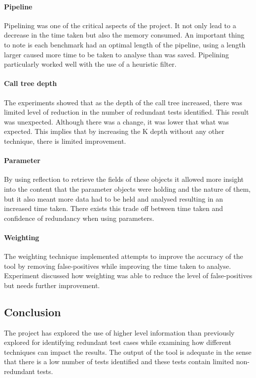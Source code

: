 \documentclass[11pt
              , a4paper
              , twoside
              , openright
              ]{report}
\newcommand{\rom}[1]{\uppercase\expandafter{\romannumeral #1\relax}}
\begin{document}
\paragraph{Pipeline}
Pipelining was one of the critical aspects of the project. It not only lead to a decrease in the time taken but also the memory consumed. An important thing to note is each benchmark had an optimal length of the pipeline, using a length larger caused more time to be taken to analyse than was saved. Pipelining particularly worked well with the use of a heuristic filter.

\paragraph{Call tree depth}
The experiments showed that as the depth of the call tree increased, there was limited level of reduction in the number of redundant tests identified. This result was unexpected. Although there was a change, it was lower that what was expected. This implies that by increasing the K depth without any other technique, there is limited improvement. 

\paragraph{Parameter}
By using reflection to retrieve the fields of these objects it allowed more insight into the content that the parameter objects were holding and the nature of them, but it also meant more data had to be held and analysed resulting in an increased time taken. There exists this trade off between time taken and confidence of redundancy when using parameters. 

\paragraph{Weighting}
The weighting technique implemented attempts to improve the accuracy of the tool by removing false-positives while improving the time taken to analyse. Experiment \rom{4} discussed how weighting was able to reduce the level of false-positives but needs further improvement.

\subsection{Conclusion}

The project has explored the use of higher level information than previously explored for identifying redundant test cases while examining how different techniques can impact the results. The output of the tool is adequate in the sense that there is a low number of tests identified and these tests contain limited non-redundant tests. 
\end{document}
